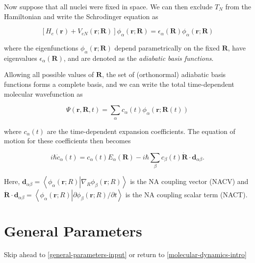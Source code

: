 \documentclass[12pt,letter,footinclude=true,headinclude=true,hyphens,oneside]{book} %
\begin{document}
    Now suppose that all nuclei were fixed in space. We can then exclude $T_N$ from the Hamiltonian and write the Schrodinger equation as
    
    \begin{equation}
    \left[ H_e(\mathbf{r}) + V_{eN}(\mathbf{r}; \mathbf{R}) \right] \phi_{\alpha}(\mathbf{r}; \mathbf{R}) = \epsilon_{\alpha}(\mathbf{R})\phi_{\alpha}(\mathbf{r}; \mathbf{R})
    \end{equation}
    
    where the eigenfunctions $\phi_{\alpha}(\mathbf{r}; \mathbf{R})$ depend parametrically on the fixed $\mathbf{R}$, have eigenvalues $\epsilon_{\alpha}(\mathbf{R})$, and are denoted as the \textit{adiabatic basis functions}.
    
    Allowing all possible values of $\mathbf{R}$, the set of (orthonormal) adiabatic basis functions forms a complete basis, and we can write the total time-dependent molecular wavefunction as
    
    \begin{equation}
    \Psi(\mathbf{r}, \mathbf{R}, t) = \sum_{\alpha} c_{\alpha}(t) \phi_{\alpha}(\mathbf{r}; \mathbf{R}(t))
    \end{equation}
    
    where $c_{\alpha}(t)$ are the time-dependent expansion coefficients. The equation of motion for these coefficients then becomes
   
    \begin{equation}
    i \hbar \dot{c}_{\alpha}(t) = c_{\alpha}(t) E_{\alpha}(\mathbf{R}) - i \hbar \sum_{\beta} c_{\beta}(t) \dot{\mathbf{R}} \cdot \mathbf{d}_{\alpha \beta}.
    \end{equation}
    
    Here, $\mathbf{d}_{\alpha \beta} = \left < \phi_{\alpha}(\mathbf{r}; R) \left | \nabla_{R} \phi_{\beta}(\mathbf{r}; R) \right . \right >$ is the NA coupling vector (NACV) and $\dot{\mathbf{R}} \cdot \mathbf{d}_{\alpha \beta} = \left < \phi_{\alpha}(\mathbf{r}; R) \left | \partial \phi_{\beta}(\mathbf{r}; R) / \partial t \right . \right >$ is the NA coupling scalar term (NACT).
    
    \section{General Parameters}
    \label{general-parameters}
    
    Skip ahead to \ref{general-parameters-input} or return to \ref{molecular-dynamics-intro}
    
\end{document}
